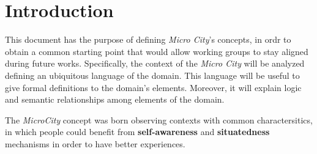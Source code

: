 \section*{Introduction}
\label{sec:introduction}

This document has the purpose of defining \textit{Micro City}'s concepts, in ordr to obtain a common starting point that would allow working groups to stay aligned during future works. Specifically, the context of the \textit{Micro City} will be analyzed defining an ubiquitous language of the domain. This language will be useful to give formal definitions to the domain's elements. Moreover, it will explain logic and semantic relationships among elements of the domain.

The \textit{MicroCity} concept was born observing contexts with common charactersitics, in which people could benefit from \textbf{self-awareness} and \textbf{situatedness} mechanisms in order to have better experiences.
